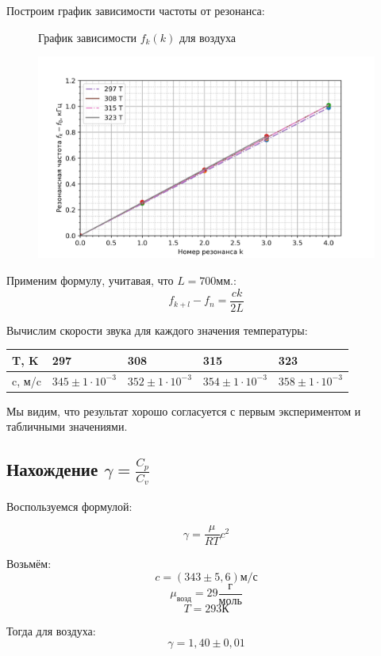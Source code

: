 \documentclass[11pt]{article}
\begin{document}
Построим график зависимости частоты от резонанса:

    \begin{figure}[H]
    \centering
    \caption{График зависимости $f_k(k)$ для воздуха}
    \includegraphics[width=\textwidth]{Gr3}
    \caption{}
    \end{figure}

Применим формулу, учитавая, что $L=700мм.$:
\[f_{k+l} - f_n = \frac{ck}{2L}\]

Вычислим скорости звука для каждого значения температуры: 

\begin{table}[!ht]
    \centering
    \begin{tabular}{|l|l|l|l|l|}
    \hline
        T, K  & 297 & 308 & 315 & 323 \\ \hline
        c, м/c & $345 ± 1 \cdot 10^{−3}$  & $352 ± 1 \cdot 10^{−3}$  & $354 ± 1 \cdot 10^{−3}$  & $358 ± 1 \cdot 10^{−3}$ \\ \hline
    \end{tabular}
\end{table} 

Мы видим, что результат хорошо согласуется с первым экспериментом и табличными значениями.
\subsection{Нахождение $\gamma = \frac{C_p}{C_v}$}

Воспользуемся формулой:

\[\gamma = \frac{\mu}{RT}c^2\]

Возьмём:
\[c=(343\pm 5,6)м/с\]
\[\mu_{возд} = 29 \frac{г}{моль}\]
\[T = 293 К\]

Тогда для воздуха: 
\[\gamma = 1,40 \pm 0,01\]
\end{document}
